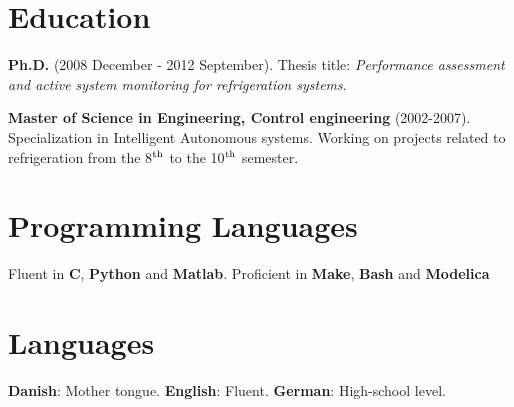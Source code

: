 \documentclass[margin,line,a4paper]{resume}
\begin{document}
\begin{resume}
\begin{description}
\end{description}

\section{\mysidestyle Education}

    \textbf{Ph.D.} (2008 December - 2012 September). Thesis title: \textit{Performance assessment and active system monitoring for refrigeration systems}.

    \textbf{Master of Science in Engineering, Control engineering}
    (2002-2007). Specialization in Intelligent Autonomous systems. Working on projects related to refrigeration from the 8$^{\rm th}$ to the 10$^{\rm th}$ semester.




\section{\mysidestyle Programming Languages}

Fluent in \textbf{C}, \textbf{Python} and \textbf{Matlab}. Proficient in \textbf{Make}, \textbf{Bash} and \textbf{Modelica}

\section{\mysidestyle Languages}

\textbf{Danish}: Mother tongue. \textbf{English}: Fluent. \textbf{German}: High-school level.





\end{resume}
\end{document}
